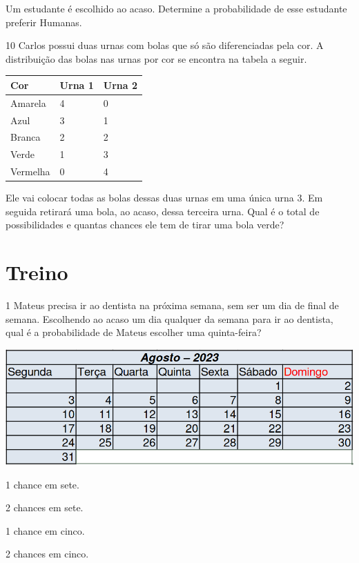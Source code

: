 Um estudante é escolhido ao acaso. Determine a probabilidade de esse
estudante preferir Humanas.


\pagebreak
\num{10} Carlos possui duas urnas com bolas que só são diferenciadas pela cor. A
distribuição das bolas nas urnas por cor se encontra na tabela a
seguir.

\begin{longtable}[]{@{}lll@{}}
\toprule
Cor & Urna 1 & Urna 2\tabularnewline
\midrule
\endhead
Amarela & 4 & 0\tabularnewline
Azul & 3 & 1\tabularnewline
Branca & 2 & 2\tabularnewline
Verde & 1 & 3\tabularnewline
Vermelha & 0 & 4\tabularnewline
\bottomrule
\end{longtable}

Ele vai colocar todas as bolas dessas duas urnas em uma única urna 3. Em
seguida retirará uma bola, ao acaso, dessa terceira urna. Qual é o total de possibilidades e quantas chances ele tem de tirar uma bola verde?


\section*{Treino}

\num{1} Mateus precisa ir ao dentista na próxima semana, 
sem ser um dia de final de semana. Escolhendo ao acaso um dia
qualquer da semana para ir ao dentista, qual é a probabilidade de Mateus
escolher uma quinta-feira?

\begin{center}
\includegraphics[width=\textwidth]{media/image37h.png}
\end{center}

\begin{escolha}
\item 
  1 chance em sete.
\item
  2 chances em sete.
\item
  1 chance em cinco.
\item
  2 chances em cinco.
\end{escolha}


